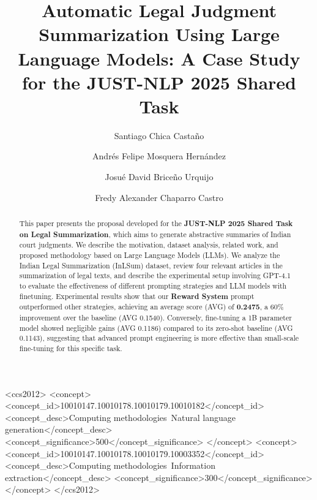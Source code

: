 \documentclass[sigconf]{acmart}
\begin{document}
\title{Automatic Legal Judgment Summarization Using Large Language Models:
A Case Study for the JUST-NLP 2025 Shared Task}

\author{Santiago Chica Castaño}

\author{Andrés Felipe Mosquera Hernández}

\author{Josué David Briceño Urquijo}

\author{Fredy Alexander Chaparro Castro}


\begin{abstract}
This paper presents the proposal developed for the \textbf{JUST-NLP 2025 Shared Task on Legal Summarization}, which aims to generate abstractive summaries of Indian court judgments. We describe the motivation, dataset analysis, related work, and proposed methodology based on Large Language Models (LLMs). We analyze the Indian Legal Summarization (InLSum) dataset, review four relevant articles in the summarization of legal texts, and describe the experimental setup involving GPT-4.1 to evaluate the effectiveness of different prompting strategies and LLM models with finetuning. Experimental results show that our \textbf{Reward System} prompt outperformed other strategies, achieving an average score (AVG) of \textbf{0.2475}, a 60\% improvement over the baseline (AVG 0.1540). Conversely, fine-tuning a 1B parameter model showed negligible gains (AVG 0.1186) compared to its zero-shot baseline (AVG 0.1143), suggesting that advanced prompt engineering is more effective than small-scale fine-tuning for this specific task.
\end{abstract}

\begin{CCSXML}
<ccs2012>
<concept>
<concept_id>10010147.10010178.10010179.10010182</concept_id>
<concept_desc>Computing methodologies~Natural language generation</concept_desc>
<concept_significance>500</concept_significance>
</concept>
<concept>
<concept_id>10010147.10010178.10010179.10003352</concept_id>
<concept_desc>Computing methodologies~Information extraction</concept_desc>
<concept_significance>300</concept_significance>
</concept>
</ccs2012>
\end{CCSXML}
\end{document}
